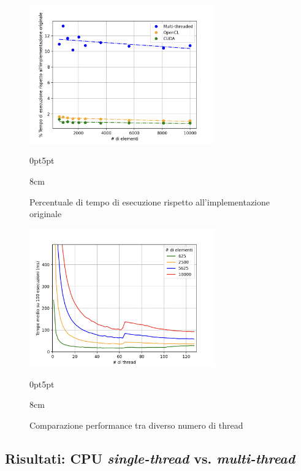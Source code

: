 \begin{figure}[!ht]
  \begin{minipage}[t]{0.5\linewidth}
    \centering
    \includegraphics[width=8cm]{images/results/gain-perc-better.png}
    \begin{adjustwidth}
      {0pt}{5pt}
      \begin{varwidth}
        {8cm}
        \caption{Percentuale di tempo di esecuzione rispetto all'implementazione
        originale}
        \label{fig:perc-better}
      \end{varwidth}
    \end{adjustwidth}
  \end{minipage}
  \begin{minipage}[t]{0.5\linewidth}
    \centering
    \includegraphics[width=8cm]{images/results/gain-comp-threads.png}
    \begin{adjustwidth}
      {0pt}{5pt}
      \begin{varwidth}
        {8cm}
        \caption{Comparazione performance tra diverso numero di thread}
        \label{fig:risultati-cpu}
      \end{varwidth}
    \end{adjustwidth}
  \end{minipage}
\end{figure}

\subsection{Risultati: CPU \textit{single-thread} vs. \textit{multi-thread}}
\label{subsec:risultati-cpu}

